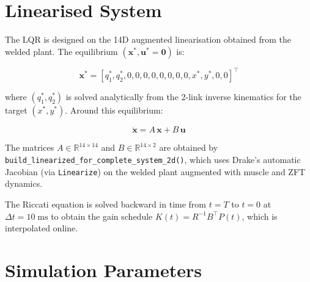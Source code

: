 \documentclass[11pt, a4paper]{article}
\begin{document}
\section{Linearised System}

The LQR is designed on the 14D augmented linearisation obtained from the
welded plant.  The equilibrium $(\bm{x}^*, \bm{u}^* = \bm{0})$ is:

\[
\bm{x}^* = [q_1^*, q_2^*, 0, 0, 0, 0, 0, 0, 0, 0, x^*, y^*, 0, 0]^{\top}
\]

where $(q_1^*, q_2^*)$ is solved analytically from the 2-link inverse kinematics
for the target $(x^*, y^*)$.  Around this equilibrium:

\[
\dot{\bm{x}} = A\,\bm{x} + B\,\bm{u}
\]

The matrices $A \in \mathbb{R}^{14\times 14}$ and $B \in \mathbb{R}^{14\times 2}$
are obtained by \texttt{build\_linearized\_for\_complete\_system\_2d()}, which
uses Drake's automatic Jacobian (via \texttt{Linearize}) on the welded plant
augmented with muscle and ZFT dynamics.

The Riccati equation is solved backward in time from $t = T$ to $t = 0$ at
$\Delta t = 10\;\mathrm{ms}$ to obtain the gain schedule
$K(t) = R^{-1}B^{\top}P(t)$, which is interpolated online.

\section{Simulation Parameters}
\end{document}
